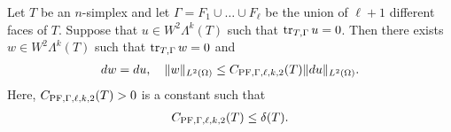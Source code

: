 \documentclass[10pt,a4paper]{article}
\begin{document}
\begin{lemma}\label{lemma:mixedbconsimplex:exteriorderivative}
    Let $T$ be an $n$-simplex 
    and let $\Gamma = F_{1} \cup \dots \cup F_{\ell}$ be the union of $\ell+1$ different faces of $T$. 
    Suppose that $u \in W^{2}\Lambda^{k}(T)$ such that 
    $\operatorname{tr}_{T,\Gamma} u = 0$.
    Then there exists $w \in W^{2}\Lambda^{k}(T)$ such that 
    $\operatorname{tr}_{T,\Gamma} w = 0$
    and  
    \begin{align*}
        d w = d u,
        \quad 
        \| w \|_{L^{2}(\Omega)} 
        \leq 
        C_{{\rm PF},\Gamma,\ell,k,2}(T)
        \| d u \|_{L^{2}(\Omega)}
        .
    \end{align*}
    Here, $C_{{\rm PF},\Gamma,\ell,k,2}(T) > 0$ is a constant such that 
    \begin{align*}
        C_{{\rm PF},\Gamma,\ell,k,2}(T)
        \leq 
        {\delta}(T)
        .
    \end{align*}
\end{lemma}
\end{document}
